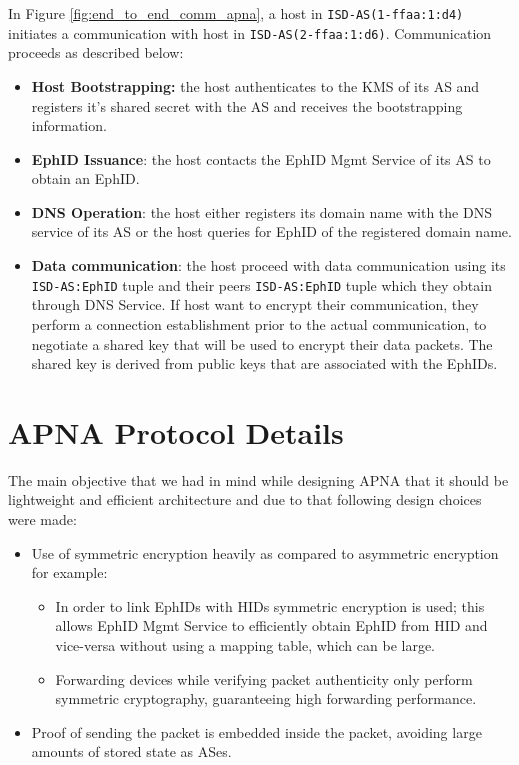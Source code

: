 In Figure \ref{fig:end_to_end_comm_apna}, a host in \texttt{ISD-AS(1-ffaa:1:d4)} initiates a communication with host in \texttt{ISD-AS(2-ffaa:1:d6)}. Communication proceeds as described below:

\begin{itemize}
    \item \textbf{Host Bootstrapping:} the host authenticates to the KMS of its AS and registers it's shared secret with the AS and receives the bootstrapping information.
    \item \textbf{EphID Issuance}: the host contacts the EphID Mgmt Service of its AS to obtain an EphID.
    \item \textbf{DNS Operation}: the host either registers its domain name with the DNS service of its AS or the host queries for EphID of the registered domain name.
    \item \textbf{Data communication}: the host proceed with data communication using its \texttt{ISD-AS:EphID} tuple and their peers \texttt{ISD-AS:EphID} tuple which they obtain through DNS Service. If host want to encrypt their communication, they perform a connection establishment prior to the actual communication, to negotiate a shared key that will be used to encrypt their data packets. The shared key is derived from public keys that are associated with the EphIDs.
\end{itemize}

\section{APNA Protocol Details} \label{sec:apna_proto}
The main objective that we had in mind while designing APNA that it should be lightweight and efficient architecture and due to that following design choices were made:

\begin{itemize}
    \item Use of symmetric encryption heavily as compared to asymmetric encryption for example:
    \begin{itemize}
        \item In order to link EphIDs with HIDs symmetric encryption is used; this allows EphID Mgmt Service to efficiently obtain EphID from HID and vice-versa without using a mapping table, which can be large.
        \item Forwarding devices while verifying packet authenticity only perform symmetric cryptography, guaranteeing high forwarding performance.
    \end{itemize}
    \item Proof of sending the packet is embedded inside the packet, avoiding large amounts of stored state as ASes. 
\end{itemize}

